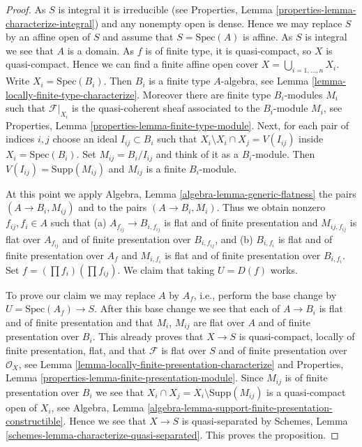 \begin{proof}
As $S$ is integral it is irreducible (see
Properties, Lemma \ref{properties-lemma-characterize-integral})
and any nonempty open is dense. Hence we may replace
$S$ by an affine open of $S$ and assume that $S = \text{Spec}(A)$ is
affine. As $S$ is integral we see that $A$ is a domain.
As $f$ is of finite type, it is quasi-compact, so $X$ is quasi-compact.
Hence we can find a finite affine open cover
$X = \bigcup_{i = 1, \ldots, n} X_i$. Write $X_i = \text{Spec}(B_i)$.
Then $B_i$ is a finite type $A$-algebra, see
Lemma \ref{lemma-locally-finite-type-characterize}.
Moreover there are finite type
$B_i$-modules $M_i$ such that $\mathcal{F}|_{X_i}$ is the
quasi-coherent sheaf associated to the $B_i$-module $M_i$, see
Properties, Lemma \ref{properties-lemma-finite-type-module}.
Next, for each pair of indices $i, j$ choose an ideal $I_{ij} \subset B_i$
such that $X_i \setminus X_i \cap X_j = V(I_{ij})$ inside
$X_i = \text{Spec}(B_i)$. Set $M_{ij} = B_i/I_{ij}$ and think
of it as a $B_i$-module. Then $V(I_{ij}) = \text{Supp}(M_{ij})$
and $M_{ij}$ is a finite $B_i$-module.

\medskip\noindent
At this point we apply
Algebra, Lemma \ref{algebra-lemma-generic-flatness}
the pairs $(A \to B_i, M_{ij})$ and to the
pairs $(A \to B_i, M_i)$. Thus we obtain
nonzero $f_{ij}, f_i \in A$ such that (a) $A_{f_{ij}} \to B_{i, f_{ij}}$
is flat and of finite presentation and $M_{ij, f_{ij}}$ is flat
over $A_{f_{ij}}$ and of finite presentation over $B_{i, f_{ij}}$, and
(b) $B_{i, f_i}$ is flat and of finite presentation over $A_f$ and
$M_{i, f_i}$ is flat and of finite presentation over $B_{i, f_i}$. Set
$f = (\prod f_i) (\prod f_{ij})$.
We claim that taking $U = D(f)$ works.

\medskip\noindent
To prove our claim we may replace $A$ by $A_f$, i.e.,
perform the base change by $U = \text{Spec}(A_f) \to S$.
After this base change we see that each of $A \to B_i$ is
flat and of finite presentation and that $M_i$, $M_{ij}$ are flat over $A$
and of finite presentation over $B_i$.
This already proves that $X \to S$ is quasi-compact,
locally of finite presentation, flat, and that $\mathcal{F}$
is flat over $S$ and of finite presentation over $\mathcal{O}_X$, see
Lemma \ref{lemma-locally-finite-presentation-characterize}
and
Properties, Lemma \ref{properties-lemma-finite-presentation-module}.
Since $M_{ij}$ is of finite presentation over $B_i$ we see that
$X_i \cap X_j = X_i \setminus \text{Supp}(M_{ij})$ is a quasi-compact
open of $X_i$, see
Algebra, Lemma \ref{algebra-lemma-support-finite-presentation-constructible}.
Hence we see that $X \to S$ is quasi-separated by
Schemes, Lemma \ref{schemes-lemma-characterize-quasi-separated}.
This proves the proposition.
\end{proof}

